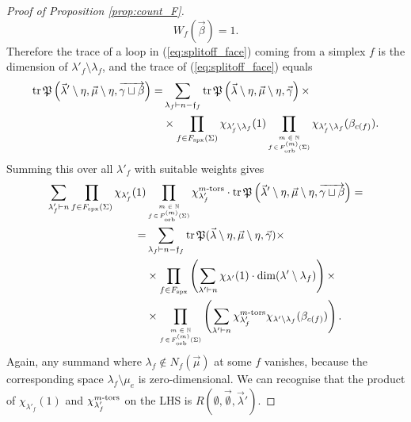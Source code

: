 \documentclass{amsart}
\newcommand{\Fspx}{F_{\textnormal{spx}}}
\newcommand{\Forb}[1][m]{F^{(#1)}_{\textnormal{orb}}}
\newcommand{\iterorb}{{\tiny\begin{matrix}m\in\mathbb{N}\\f\!\in\!\Forb(\Sigma)\end{matrix}}}
\newcommand{\tn}{\textnormal}
\newcommand{\tr}{\operatorname{tr}}
\begin{document}
\begin{proof}[Proof of Proposition \ref{prop:count_F}]
\begin{equation}\label{eq:W_covered_id}
W_f(\vec\beta)=1.
\end{equation}
Therefore the trace of a loop in (\ref{eq:splitoff_face}) coming from a simplex $f$ is the dimension of $\lambda'_f\setminus\lambda_f$, and the trace of (\ref{eq:splitoff_face}) equals
\begin{align*}
\tr\mathfrak{P}\left(\vec\lambda'\setminus\eta,\vec\mu\setminus\eta,\overrightarrow{\gamma\sqcup\beta}\right)=&\sum_{\lambda_f\vdash n-\mathfrak{f}_f}\tr\mathfrak{P}\left(\vec\lambda\setminus\eta,\vec\mu\setminus\eta,\vec\gamma\right)\times\\
&\times\prod_{f\in\Fspx(\Sigma)}\chi_{\lambda'_f\setminus\lambda_f}(1)\prod_\iterorb\chi_{\lambda'_f\setminus\lambda_f}(\beta_{c(f)}).
\end{align*}
Summing this over all $\lambda'_f$ with suitable weights gives
\begin{align}\begin{split}\label{eq:resummed_f}
\sum_{\lambda'_f\vdash n}\prod_{f\in\Fspx(\Sigma)}\chi_{\lambda'_f}(1)&\prod_\iterorb\chi_{\lambda'_f}^{m\tn{-tors}}\cdot\tr\mathfrak{P}\left(\vec\lambda'\setminus\eta,\vec\mu\setminus\eta,\overrightarrow{\gamma\sqcup\beta}\right)=\\
=&\sum_{\lambda_f\vdash n-\mathfrak{f}_f}\tr\mathfrak{P}(\vec\lambda\setminus\eta,\vec\mu\setminus\eta,\vec\gamma)\times\\
&\times\prod_{f\in\Fspx}\left(\sum_{\lambda'\vdash n}\chi_{\lambda'}(1)\cdot\tn{dim}(\lambda'\setminus\lambda_f)\right)\times\\
&\times\prod_\iterorb\left(\sum_{\lambda'\vdash n}\chi_{\lambda'_f}^{m\tn{-tors}}\chi_{\lambda'\setminus\lambda_f}(\beta_{c(f)})\right).
\end{split}\end{align}
Again, any summand where $\lambda_f\notin N_f(\vec\mu)$ at some $f$ vanishes, because the corresponding space $\lambda_f\setminus\mu_e$ is zero-dimensional. We can recognise that the product of $\chi_{\lambda'_f}(1)$ and $\chi_{\lambda'_f}^{m\tn{-tors}}$ on the LHS is $R(\emptyset,\vec\emptyset,\vec\lambda')$.


\end{proof}
\end{document}
